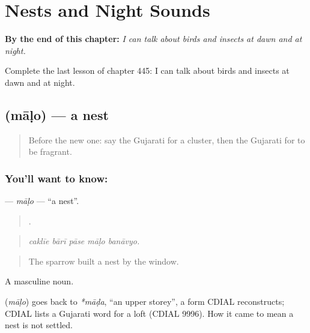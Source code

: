 
\chapter{Nests and Night Sounds}
\label{ch:gu-nests-and-night-sounds}

\begin{chapteropening}
\textbf{By the end of this chapter:} \emph{I can talk about birds and insects at dawn and at night.}

Complete the last lesson of chapter 445: I can talk about birds and insects at dawn and at night.
\end{chapteropening}

\section[\texorpdfstring{\gu{માળો} (māḷo)}{માળો (māḷo)}]{ (māḷo) — a nest}

\label{lesson:GU-C445-malo}



\begin{quote}
Before the new one: say the Gujarati for a cluster, then the Gujarati for to be fragrant.
\end{quote}

\subsection*{You'll want to know: }
\textbf{} — \emph{māḷo} — \textquotedblleft{}a nest\textquotedblright{}.

\begin{quote}
    .
\end{quote}

\begin{quote}
\emph{caklīe bārī pāse māḷo banāvyo.}
\end{quote}

\begin{quote}
The sparrow built a nest by the window.
\end{quote}

A masculine noun.

\begin{cousinweb}
\textbf{} (\emph{māḷo}) goes back to \emph{*māḍa}, \textquotedblleft{}an upper storey\textquotedblright{}, a form CDIAL reconstructs; CDIAL lists a Gujarati word for a loft (CDIAL 9996). How it came to mean a nest is not settled.
\end{cousinweb}


